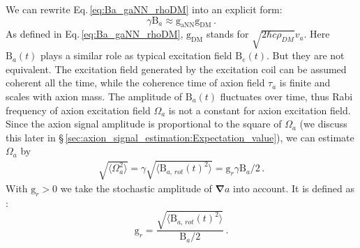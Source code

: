 We can rewrite Eq.\,\eqref{eq:Ba_gaNN_rhoDM} into an explicit form:
\begin{equation}
    \gamma \mathrm{B}_{a} \approx \mathrm{g_{aNN}} \mathrm{g_{DM}}  \,. %
\end{equation}
As defined in Eq.\,\eqref{eq:Ba_gaNN_rhoDM}, $\mathrm{g_{DM}}$ stands for $\sqrt{2 \hbar c \rho_{DM}} v_a$. Here $\mathrm{B}_{a}(t)$ plays a similar role as typical excitation field $\mathrm{B}_{e}(t)$. But they are not equivalent. The excitation field generated by the excitation coil can be assumed coherent all the time, while the coherence time of axion field $\tau_a$ is finite and scales with axion mass. The amplitude of $\mathrm{B}_{a}(t)$ fluctuates over time, thus Rabi frequency of axion excitation field $\Omega_a$ is not a constant for axion excitation field. 
Since the axion signal amplitude is proportional to the square of $\Omega_a$ (we discuss this later in \S\,\ref{sec:axion_signal_estimation:Expectation_value}), we can estimate $\Omega_a$ by
\begin{align}
    \sqrt{\langle \Omega_a^2 \rangle} = \gamma \sqrt{\langle \mathrm{B}_{a,\,rot}(t)^2 \rangle}
    = \mathrm{g}_{r} \gamma \mathrm{B}_{a} /2
    \,. \label{eq:Omega_gr_gamma_Ba_gaNN}
\end{align}
With $\mathrm{g}_{r} > 0$ we take the stochastic amplitude of ${\boldsymbol \nabla} a$ into account. 
It is defined as%
:
\begin{equation}
    \mathrm{g}_{r} = \dfrac{\sqrt{\langle \mathrm{B}_{a,\,rot}(t)^2 \rangle}}{\mathrm{B}_{a}/2}
    \,.\label{eq:gr_expectationBat_Ba}
\end{equation}
